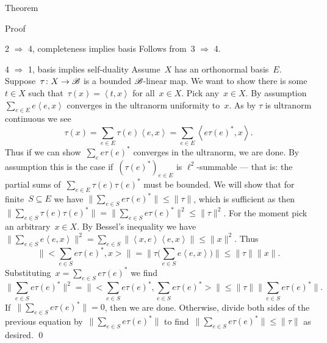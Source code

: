 \documentclass[b]{subfiles}
\begin{document}
\begin{parsec}
\begin{point}{Theorem}
\begin{point}{Proof}
\begin{point}{2 $\Rightarrow$ 4, completeness implies basis}%
    Follows from~3 $\Rightarrow$ 4.
\end{point}
\begin{point}{4 $\Rightarrow$ 1, basis implies self-duality}%
    Assume~$X$ has an orthonormal basis~$E$.
    Suppose~$\tau\colon X \to \mathscr{B}$ is a bounded $\mathscr{B}$-linear map.
    We want to show there is some~$t \in X$
    such that~$\tau(x) = \left<t,x\right>$ for all~$x \in X$.
    Pick any~$x \in X$.
    By assumption~$\sum_{e \in E} e  \left<e,x\right>$
        converges in the ultranorm uniformity to~$x$.
As by  $\tau$ is ultranorm continuous
        we see
        \begin{equation*}
            \tau(x) = \sum_{e \in E} \tau(e) \left<e,x\right>
                = \sum_{e \in E} \left<e \tau(e)^*,x\right>.
        \end{equation*}
    Thus if we can show~$\sum_e e \tau(e)^*$ converges in the ultranorm,
        we are done. By assumption this is
            the case if~$(\tau(e)^*)_{e \in E} $ is $\ell^2$-summable
            --- that is: the partial sums of~$\sum_{e \in E} \tau(e)\tau(e)^*$
                must be bounded.
        We will show
        that for finite~$S \subseteq E$
        we have
        $\|\sum_{e \in S} e \tau(e)^* \|\leq \|\tau\|$,
        which is sufficient as then~$ \| \sum_{e \in S}  \tau(e)\tau(e)^* \|
        =\|\sum_{e \in S} e \tau(e)^* \|^2  \leq \|\tau\|^2$.
For the moment pick an arbitrary~$x \in X$.
By Bessel's inequality
we have~$
\| \sum_{e\in S} e \left<e,x\right>\|^2
    = \sum_{e\in S} \|\left<x,e\right>\left<e,x\right>\|
    \leq \|x\|^2$.
Thus
    \begin{equation*}
        \bigl\|\bigl< \sum_{e \in S} e \tau(e)^*,x\bigr>\bigr\|
        = \bigl\| \tau \bigl(\sum_{e \in S} e\left<e,x\right>\bigr) \bigr\|
        \leq \|\tau\| \|x\|.
    \end{equation*}
Substituting~$x = \sum_{e \in S} e \tau(e)^*$ we find
\begin{equation*}
    \| \sum_{e\in S}e \tau(e)^*\|^2 =
    \bigl\|\bigl< \sum_{e \in S} e \tau(e)^*,\sum_{e \in S} e\tau(e)^*\bigr>\bigr\|
    \leq \|\tau\| \bigl\| \sum_{e\in S}e \tau(e)^*\bigr\|.
\end{equation*}
If~$ \| \sum_{e\in S}e \tau(e)^*\| = 0$,
then we are done.
Otherwise, divide both sides of the previous equation
by~$ \| \sum_{e\in S}e \tau(e)^*\|$
to find~$ \| \sum_{e\in S}e \tau(e)^*\| \leq \|\tau\|$ as desired. \qed
\end{point}
\end{point}
\end{point}
\end{parsec}
\end{document}
